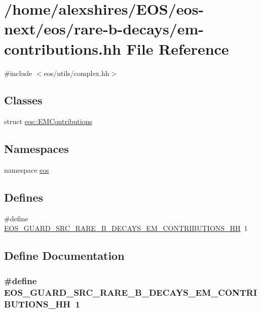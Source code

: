 \hypertarget{em-contributions_8hh}{
\section{/home/alexshires/EOS/eos-\/next/eos/rare-\/b-\/decays/em-\/contributions.hh File Reference}
\label{em-contributions_8hh}
}
{\ttfamily \#include $<$eos/utils/complex.hh$>$}\par
\subsection*{Classes}
\begin{DoxyCompactItemize}
\item 
struct \hyperlink{structeos_1_1EMContributions}{eos::EMContributions}
\end{DoxyCompactItemize}
\subsection*{Namespaces}
\begin{DoxyCompactItemize}
\item 
namespace \hyperlink{namespaceeos}{eos}
\end{DoxyCompactItemize}
\subsection*{Defines}
\begin{DoxyCompactItemize}
\item 
\#define \hyperlink{em-contributions_8hh_a40ecb972bc9ffd4d87f689f41aa2b683}{EOS\_\-GUARD\_\-SRC\_\-RARE\_\-B\_\-DECAYS\_\-EM\_\-CONTRIBUTIONS\_\-HH}~1
\end{DoxyCompactItemize}


\subsection{Define Documentation}
\hypertarget{em-contributions_8hh_a40ecb972bc9ffd4d87f689f41aa2b683}{
\subsubsection[{EOS\_\-GUARD\_\-SRC\_\-RARE\_\-B\_\-DECAYS\_\-EM\_\-CONTRIBUTIONS\_\-HH}]{\setlength{\rightskip}{0pt plus 5cm}\#define EOS\_\-GUARD\_\-SRC\_\-RARE\_\-B\_\-DECAYS\_\-EM\_\-CONTRIBUTIONS\_\-HH~1}}
\label{em-contributions_8hh_a40ecb972bc9ffd4d87f689f41aa2b683}

